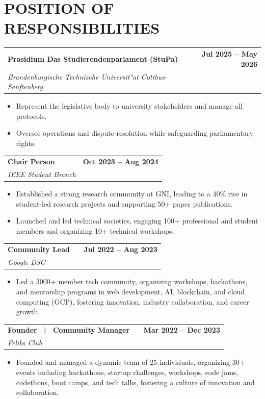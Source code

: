 \documentclass[a4paper,11pt]{article}
\makeatletter
\newcommand{\entryheader}[4]{%
  \begin{tabularx}{\textwidth}{@{}>{\RaggedRight\arraybackslash}X r@{}}
    \textbf{#1} & \textbf{#2} \\
    \textit{#3} & \textit{#4} \\
  \end{tabularx}%
}
\newenvironment{entrybullets}{%
  \begin{minipage}[t]{0.77\textwidth}
    \begin{itemize}[leftmargin=*,label=\textbullet,align=left]
}{%
    \end{itemize}
  \end{minipage}
}
\newcommand{\extlink}{\raisebox{0.2ex}{\scriptsize\faExternalLink*}}
\makeatother
\begin{document}
\section*{POSITION OF RESPONSIBILITIES}
\entryheader{Prasidium Das Studierendenparlament (StuPa)}{Jul 2025 -- May 2026}{Brandenburgische Technische Universit"at Cottbus-Senftenberg}{}
\begin{entrybullets}
  \item Represent the legislative body to university stakeholders and manage all protocols.
  \item Oversee operations and dispute resolution while safeguarding parliamentary rights.
\end{entrybullets}

\vspace{0.25cm}
\entryheader{Chair Person}{Oct 2023 -- Aug 2024}{IEEE Student Branch}{}
\begin{entrybullets}
  \item Established a strong research community at GNI, leading to a 40\% rise in student-led research projects and supporting 50+ paper publications.
  \item Launched and led technical societies, engaging 100+ professional and student members and organizing 10+ technical workshops.
\end{entrybullets}

\vspace{0.25cm}
\newpage
\thispagestyle{secondpage}

\entryheader{Community Lead \ \extlink}{Jul 2022 -- Aug 2023}{Google DSC}{}
\begin{entrybullets}
  \item Led a 3000+ member tech community, organizing workshops, hackathons, and mentorship programs in web development, AI, blockchain, and cloud computing (GCP), fostering innovation, industry collaboration, and career growth.
\end{entrybullets}

\vspace{0.25cm}
\entryheader{Founder \ | \ Community Manager \ \extlink}{Mar 2022 -- Dec 2023}{Feliks Club}{}
\begin{entrybullets}
  \item Founded and managed a dynamic team of 25 individuals, organizing 30+ events including hackathons, startup challenges, workshops, code jams, codethons, boot camps, and tech talks, fostering a culture of innovation and collaboration.
\end{entrybullets}
\end{document}
